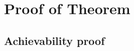 \section{Proof of Theorem}
\label{sec:proof-theorem}

\subsection{Achievability proof}
\label{subec:achievability-proof}



